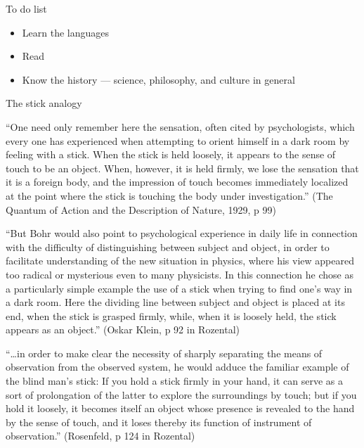 \documentclass[ignorenonframetext, ]{beamer}
\begin{document}
\begin{frame}{To do list}

  \begin{itemize}
  \item Learn the languages
  \item Read 
  \item Know the history --- science, philosophy, and culture in
    general
  \end{itemize}

\end{frame}  
  


\begin{frame}{The stick analogy}

  ``One need only remember here the sensation, often cited by
  psychologists, which every one has experienced when attempting to
  orient himself in a dark room by feeling with a stick. When the
  stick is held loosely, it appears to the sense of touch to be an
  object. When, however, it is held firmly, we lose the sensation that
  it is a foreign body, and the impression of touch becomes
  immediately localized at the point where the stick is touching the
  body under investigation.'' (The Quantum of Action and the
  Description of Nature, 1929, p 99)

\end{frame}

\begin{frame}

  ``But Bohr would also point to psychological experience in daily
  life in connection with the difficulty of distinguishing between
  subject and object, in order to facilitate understanding of the new
  situation in physics, where his view appeared too radical or
  mysterious even to many physicists. In this connection he chose as a
  particularly simple example the use of a stick when trying to find
  one's way in a dark room. Here the dividing line between subject and
  object is placed at its end, when the stick is grasped firmly,
  while, when it is loosely held, the stick appears as an object.''
  (Oskar Klein, p 92 in Rozental)

\end{frame}

\begin{frame}

  ``\dots in order to make clear the necessity of sharply separating
  the means of observation from the observed system, he would adduce
  the familiar example of the blind man's stick: If you hold a stick
  firmly in your hand, it can serve as a sort of prolongation of the
  latter to explore the surroundings by touch; but if you hold it
  loosely, it becomes itself an object whose presence is revealed to
  the hand by the sense of touch, and it loses thereby its function of
  instrument of observation.'' (Rosenfeld, p 124 in Rozental)

\end{frame}
\end{document}
